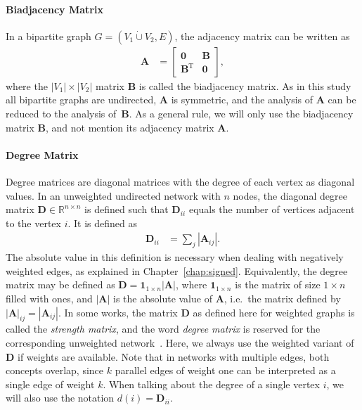 \documentclass[11pt,a4paper]{book}
\newcommand{\dunion}{\mathbin{\dot\cup}} %
\begin{document}
\paragraph{Biadjacency Matrix}
In a bipartite graph $G=(V_1 \dunion V_2, E)$, the adjacency matrix can
be written as  
\begin{align}
  \mathbf A &= \left[ \begin{array}{cc} \mathbf 0 & \mathbf B \\ \mathbf
      B^{\mathrm T} & \mathbf 0 \end{array} \right],
  \label{eq:biadjacency-matrix}
\end{align}
where the $|V_1| \times |V_2|$ matrix $\mathbf B$ is called the biadjacency
matrix.  As in this study all bipartite graphs are undirected, $\mathbf
A$ is symmetric, and the analysis of $\mathbf A$ can be reduced to the
analysis of~$\mathbf B$.  As a general rule, we will only use the
biadjacency matrix $\mathbf B$, and not mention
its adjacency matrix $\mathbf A$. 

\paragraph{Degree Matrix}
\label{para:degree-matrix}
Degree matrices are diagonal matrices with the degree of each
vertex as diagonal values. 
In an unweighted undirected network with $n$ nodes, the diagonal degree
matrix $\mathbf D \in \mathbb R^{n \times n}$ is defined such that
$\mathbf D_{ii}$ equals the number of vertices adjacent to the vertex
$i$.  
It is defined as 
\begin{align} 
  \mathbf D_{ii} &= \sum_j |\mathbf A_{ij}|. 
  \label{eq:degree-matrix}
\end{align} 
The absolute value in this definition is necessary when dealing
with negatively weighted edges, as explained in
Chapter~\ref{chap:signed}.  
Equivalently, the degree matrix may be defined as $\mathbf D = \mathbf
1_{1\times n} |\mathbf A|$, where $\mathbf 1_{1\times n}$ is the
matrix of size $1 \times n$ filled with ones, and $|\mathbf A|$ is
the absolute value of $\mathbf A$, i.e.\ the matrix defined by
$|\mathbf A|_{ij} = |\mathbf A_{ij}|$. 
In some works, the matrix $\mathbf D$ as
defined here for weighted graphs is called the \emph{strength matrix},
and the word \emph{degree matrix} is reserved for the corresponding
unweighted network~\cite{b608}.  Here, we always use the weighted variant of
$\mathbf D$ if weights are available.  Note that in networks with
multiple edges, both concepts overlap, since $k$ parallel edges of
weight one can be interpreted as a single edge of weight $k$. 
When talking about the degree of a single vertex $i$, we will also
use the notation $d(i) = \mathbf D_{ii}$. 
\end{document}
